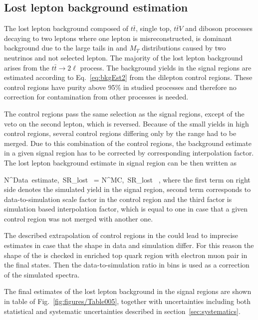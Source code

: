 \subsection{Lost lepton background estimation}

The lost lepton background composed of $t\bar{t}$, single top, $t\bar{t}V$ and diboson processes decaying to two leptons where one lepton is misreconstructed, is dominant background due to the large tails in \MET and $M_{T}$ distributions caused by two neutrinos and not selected lepton. The majority of the lost lepton background arises from the $t\bar{t} \to 2\ell$ process. The background yields in the signal regions are estimated according to Eq.~\ref{eq:bkgEst2} from the dilepton control regions. These control regions have purity above 95\% in studied processes and therefore no correction for contamination from other processes is needed. 

The control regions pass the same selection as the signal regions, except of the veto on the second lepton, which is reversed. Because of the small yields in high \MET control regions, several control regions differing only by the \MET range had to be merged. Due to this combination of the control regions, the background estimate in a given signal region has to be corrected by corresponding interpolation factor. The lost lepton background estimate in signal region can be then written as

{
N^{Data~estimate,~SR}_{lost~\ell}  = N^{MC,~SR}_{lost~\ell} \times  {} \times {},
}
where the first term on right side denotes the simulated yield in the signal region, second term corresponds to data-to-simulation scale factor in the control region and the third factor is simulation based interpolation factor, which is equal to one in case that a given control region was not merged with another one.

The described extrapolation of control regions in the \MET could lead to imprecise estimates in case that the \MET shape in data and simulation differ. For this reason the shape of the \MET is checked in enriched top quark region with electron muon pair in the final states. Then the data-to-simulation ratio in \MET bins is used as a correction of the simulated \MET spectra. 

The final estimates of the lost lepton background in the signal regions are shown in table of Fig.~\ref{fig:figures/Table005}, together with uncertainties including both statistical and systematic uncertainties described in section~\ref{sec:systematics}.


